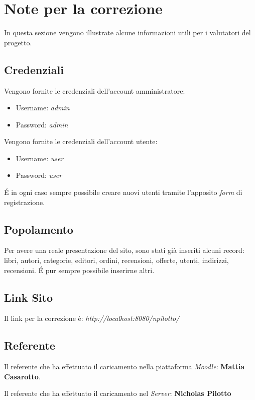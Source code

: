 \section{Note per la correzione}\label{sec:correzione}
In questa sezione vengono illustrate alcune informazioni utili per i valutatori del progetto.

\subsection{Credenziali}
Vengono fornite le credenziali dell’account amministratore:
\begin{itemize}
	\item Username: \textit{admin}
	\item Password: \textit{admin}
\end{itemize}

Vengono fornite le credenziali dell’account utente: 
\begin{itemize}
	\item Username: \textit{user}
	\item Password: \textit{user}
\end{itemize}
É in ogni caso sempre possibile creare nuovi utenti tramite l’apposito \textit{form} di registrazione.

\subsection{Popolamento}
Per avere una reale presentazione del sito, sono stati già inseriti alcuni record: libri, autori, categorie, editori, ordini, recensioni, offerte, utenti, indirizzi, recensioni. É pur sempre possibile inserirne altri.

\subsection{Link Sito}
Il link per la correzione è: \textit{http://localhost:8080/npilotto/}

\subsection{Referente}
Il referente che ha effettuato il caricamento nella piattaforma \textit{Moodle}: \textbf{Mattia Casarotto}.

Il referente che ha effettuato il caricamento nel \textit{Server}: \textbf{Nicholas Pilotto}